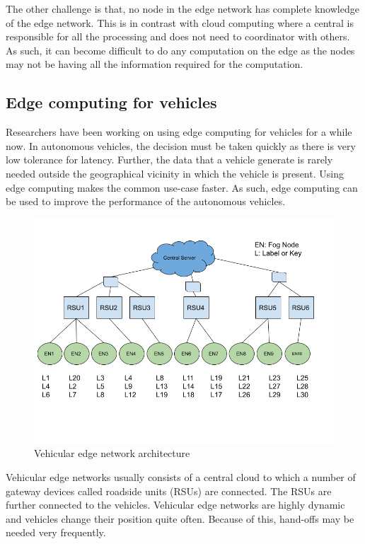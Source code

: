 The other challenge is that, no node in the edge network has complete knowledge of
the edge network. This is in contrast with cloud computing where a central is
responsible for all the processing and does not need to coordinator with others.
As such, it can become difficult to do any computation on the edge as the nodes
may not be having all the information required for the computation.

\subsection{Edge computing for vehicles}

Researchers have been working on using edge computing for vehicles for a while
now. In autonomous vehicles, the decision must be taken quickly as there is very
low tolerance for latency. Further, the data that a vehicle generate is rarely
needed outside the geographical vicinity in which the vehicle is present. Using
edge computing makes the common use-case faster. As such, edge computing can be
used to improve the performance of the autonomous vehicles.

\begin{figure}[h]
      \centering
      \includegraphics[width=1.0\textwidth]{"Vehicular Edge Network.png"}
      \caption{Vehicular edge network architecture}
\end{figure}

Vehicular edge networks usually consists of a central cloud to which a number of
gateway devices called roadside units (RSUs) are connected. The RSUs are further
connected to the vehicles. Vehicular edge networks are highly dynamic and
vehicles change their position quite often. Because of this, hand-offs may be
needed very frequently.

